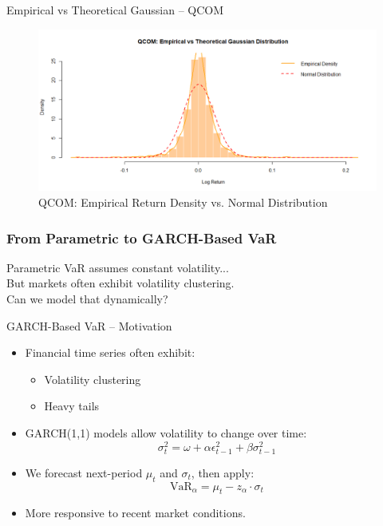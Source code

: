 \documentclass{beamer}[9pt]
\begin{document}
\begin{frame}{Empirical vs Theoretical Gaussian – QCOM}
	\begin{figure}[!h]
		\centering
		\includegraphics[width=0.85\linewidth]{plots/qcom_density_plot.png}
		\caption{QCOM: Empirical Return Density vs. Normal Distribution}
	\end{figure}
\end{frame}


\begin{frame}
	\frametitle{From Parametric to GARCH-Based VaR}
	\centering
	\Large
	Parametric VaR assumes constant volatility... \\
	But markets often exhibit volatility clustering. \\
	Can we model that dynamically?
\end{frame}

\begin{frame}{GARCH-Based VaR – Motivation}
	\begin{itemize}
		\item Financial time series often exhibit:
		\begin{itemize}
			\item Volatility clustering
			\item Heavy tails
		\end{itemize}
		\item GARCH(1,1) models allow volatility to change over time:
		\[
		\sigma_t^2 = \omega + \alpha \epsilon_{t-1}^2 + \beta \sigma_{t-1}^2
		\]
		\item We forecast next-period $\mu_t$ and $\sigma_t$, then apply:
		\[
		\text{VaR}_\alpha = \mu_t - z_\alpha \cdot \sigma_t
		\]
		\item More responsive to recent market conditions.
	\end{itemize}
\end{frame}
\end{document}
